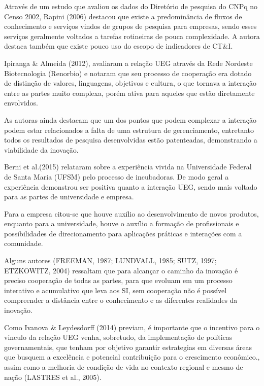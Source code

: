 Através de um estudo que avaliou os dados do Diretório de pesquisa do CNPq no Censo 2002, Rapini (2006) destacou que existe a predominância de fluxos de conhecimento e serviços vindos de grupos de pesquisa para empresas, sendo esses serviços geralmente voltados a tarefas rotineiras de pouca complexidade. A autora destaca também que existe pouco uso do escopo de indicadores de CT\&I.

Ipiranga \& Almeida (2012), avaliaram a relação UEG através da Rede Nordeste Biotecnologia (Renorbio) e notaram que seu processo de cooperação era dotado de distinção de valores, linguagens, objetivos e cultura, o que tornava a interação entre as partes muito complexa, porém ativa para aqueles que estão diretamente envolvidos.

As autoras ainda destacam que um dos pontos que podem complexar a interação podem estar relacionados a falta de uma estrutura de gerenciamento, entretanto todos os resultados de pesquisa desenvolvidas estão patenteadas, demonstrando a viabilidade da inovação.

Berni et al.(2015) relataram sobre a experiência vivida na Universidade Federal de Santa Maria (UFSM) pelo processo de incubadoras. De modo geral a experiência demonstrou ser positiva quanto a interação UEG, sendo mais voltado para as partes de universidade e empresa.

Para a empresa citou-se que houve auxílio ao desenvolvimento de novos produtos, enquanto para a universidade, houve o auxílio a formação de profissionais e possibilidades de direcionamento para aplicações práticas e interações com a comunidade.

Alguns autores (FREEMAN, 1987; LUNDVALL, 1985; SUTZ, 1997; ETZKOWITZ, 2004) ressaltam que para alcançar o caminho da inovação é preciso cooperação de todas as partes, para que evoluam em um processo interativo e acumulativo que leva aos SI, sem cooperação não é possível compreender a distância entre o conhecimento e as diferentes  realidades da inovação.

Como Ivanova \& Leydesdorff (2014) previam, é importante que o incentivo para o vinculo da relação UEG venha, sobretudo, da implementação de políticas governamentais, que tenham por objetivo garantir estrategias em diversas áreas que busquem a excelência e potencial contribuição para o crescimento econômico., assim como a melhoria de condição de vida no contexto regional e mesmo de nação (LASTRES et al., 2005).

